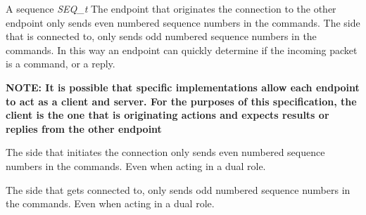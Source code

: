 A sequence \textit{SEQ\_t} The endpoint that originates
the connection to the other endpoint only sends even
numbered sequence numbers in the commands.
The side that is connected to, only sends odd numbered
sequence numbers in the commands.
In this way an endpoint can quickly determine if the incoming packet
is a command, or a reply.

\textbf{NOTE: It is possible that specific implementations allow
  each endpoint to act as a client and server.
  For the purposes of this specification, the client is
  the one that is originating actions and expects
  results or replies from the other endpoint}

The side that initiates the connection only sends
even numbered sequence numbers in the commands.
Even when acting in a dual role.

The side that gets connected to, only sends
odd numbered sequence numbers in the commands.
Even when acting in a dual role.
